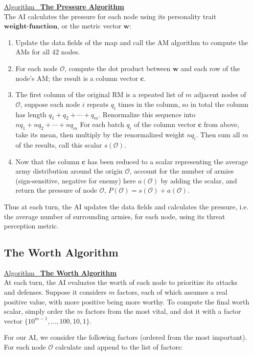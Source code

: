\documentclass[12pt]{article}  %
\newcommand{\algtitle}[1]{\underline{Algorithm \ {\bf #1}} \vspace*{1mm}\\}
\begin{document}
\algtitle{The Pressure Algorithm}
The AI calculates the pressure for each node using its personality trait $\textbf{weight-function}$, or the metric vector $\mathbf{w}$:
\begin{enumerate}
	\item Update the data fields of the map and call the AM algorithm to compute the AMs for all 42 nodes.
	\item For each node $\mathcal{O}$, compute the dot product between $\mathbf{w}$ and each row of the node's AM; the result is a column vector $\mathbf{c}$.
	\item The first column of the original RM is a repeated list of $m$ adjacent nodes of $\mathcal{O}$, suppose each node $i$ repeats $q_i$ times in the column, so in total the column has length $q_1 + q_2 + \cdots + q_m$. Renormalize this sequence into $nq_1 + nq_2 + \cdots + nq_m$ For each batch $q_i$ of the column vector $\mathbf{c}$ from above, take its mean, then multiply by the renormalized weight $nq_i$. Then sum all $m$ of the results, call this scalar $s(\mathcal{O})$.
	\item Now that the column $\mathbf{c}$ has been reduced to a scalar representing the average army distribution around the origin $\mathcal{O}$, account for the number of armies (sign-sensitive, negative for enemy) here $a(\mathcal{O})$ by adding the scalar, and return the pressure of node $\mathcal{O}$, $P(\mathcal{O}) = s(\mathcal{O}) + a(\mathcal{O})$.
\end{enumerate}


Thus at each turn, the AI updates the data fields and calculates the pressure, i.e. the average number of surrounding armies, for each node, using its threat perception metric.




\subsection{The Worth Algorithm}

\algtitle{The Worth Algorithm}
At each turn, the AI evaluates the worth of each node to prioritize its attacks and defenses. Suppose it considers $m$ factors, each of which assumes a real positive value, with more positive being more worthy. To compute the final worth scalar, simply order the $m$ factors from the most vital, and dot it with a factor vector $\{10^{m-1}, ..., 100, 10, 1\}$.

For our AI, we consider the following factors (ordered from the most important). For each node $\mathcal{O}$ calculate and append to the list of factors:
\end{document}
